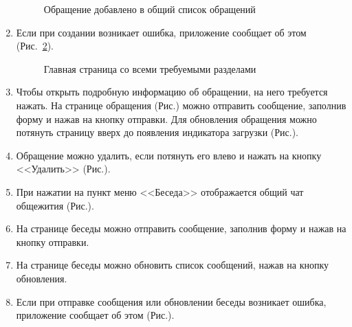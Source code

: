 \documentclass{../includes/TechDoc}
\begin{document}
\begin{enumerate}
\begin{figure}[ht]
\begin{center}
\begin{minipage}[ht]{0.35\linewidth}
                    \caption{Обращение добавлено в общий список обращений}
                    \label{ris:problem_list}
                \end{minipage}
            \end{center}
        \end{figure}

        \item Если при создании возникает ошибка, приложение сообщает об этом (Рис.~\ref{ris:create_new_problem_error}).
        \begin{figure}[ht]
            \centering
            \caption{Главная страница со всеми требуемыми разделами}
            \label{ris:create_new_problem_error}
        \end{figure}

        \item Чтобы открыть подробную информацию об обращении, на него требуется нажать.
        На странице обращения (Рис.) можно отправить сообщение, заполнив форму и нажав на кнопку отправки.
        Для обновления обращения можно потянуть страницу вверх до появления индикатора загрузки (Рис.).

        \item Обращение можно удалить, если потянуть его влево и нажать на кнопку <<Удалить>> (Рис.).

        \item При нажатии на пункт меню <<Беседа>> отображается общий чат общежития (Рис.).

        \item На странице беседы можно отправить сообщение, заполнив форму и нажав на кнопку отправки.

        \item На странице беседы можно обновить список сообщений, нажав на кнопку обновления.

        \item Если при отправке сообщения или обновлении беседы возникает ошибка, приложение сообщает об этом (Рис.).
    \end{enumerate}
\end{document}
